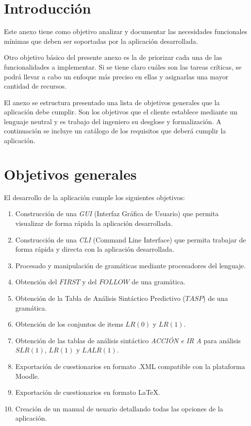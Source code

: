 
\section{Introducción}
Este anexo tiene como objetivo analizar y documentar las necesidades funcionales mínimas que deben ser soportadas por la aplicación desarrollada. 

Otro objetivo básico del presente anexo es la de priorizar cada una de las funcionalidades a implementar. Si se tiene claro cuáles son las tareas críticas, se podrá llevar a cabo un enfoque más preciso en ellas y asignarlas una mayor cantidad de recursos.

El anexo se estructura presentado una lista de objetivos generales que la aplicación debe cumplir. Son los objetivos que el cliente establece mediante un lenguaje neutral y es trabajo del ingeniero su desglose y formalización. A continuación se incluye un catálogo de los requisitos que deberá cumplir la aplicación.

\section{Objetivos generales}
El desarrollo de la aplicación cumple los siguientes objetivos:
\begin{enumerate}
	\item Construcción de una \textit{GUI} (Interfaz Gráfica de Usuario) que permita visualizar de forma rápida la aplicación desarrollada.
	\item Construcción de una \textit{CLI} (Command Line Interface) que permita trabajar de forma rápida y directa con la aplicación desarrollada.
	\item Procesado y manipulación de gramáticas mediante procesadores del lenguaje.
	\item Obtención del $FIRST$ y del $FOLLOW$ de una gramática.
	\item Obtención de la Tabla de Análisis Sintáctico Predictivo ($TASP$) de una gramática.
	\item Obtención de los conjuntos de items $LR(0)$ y  $LR(1)$.
	\item Obtención de las tablas de análisis sintáctico  \textit{ACCIÓN e IR A} para análisis $SLR(1)$, $LR(1)$ y $LALR(1)$.
	\item Exportación de cuestionarios en formato .XML compatible con la plataforma Moodle.
	
	\item Exportación de cuestionarios en formato \LaTeX{}.
	
	\item Creación de un manual de usuario detallando todas las opciones de la aplicación.
\end{enumerate}

